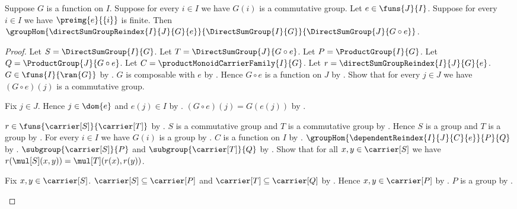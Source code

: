 \begin{theorem}\label{direct_sum_group_reindex_hom}
    Suppose $G$ is a function on $I$.
    Suppose for every $i\in I$ we have $G(i)$ is a commutative group.
    Let $e\in\funs{J}{I}$.
    Suppose for every $i\in I$ we have $\preimg{e}{\{i\}}$ is finite.
    Then
        $\groupHom{\directSumGroupReindex{I}{J}{G}{e}}{
            \DirectSumGroup{I}{G}}{\DirectSumGroup{J}{G\circ e}}$.
\end{theorem}
\begin{proof}
    Let $S=\DirectSumGroup{I}{G}$.
    Let $T=\DirectSumGroup{J}{G\circ e}$.
    Let $P=\ProductGroup{I}{G}$.
    Let $Q=\ProductGroup{J}{G\circ e}$.
    Let $C=\productMonoidCarrierFamily{I}{G}$.
    Let $r=\directSumGroupReindex{I}{J}{G}{e}$.
    $G\in\funs{I}{\ran{G}}$ by
        .
    $G$ is composable with $e$ by .
    Hence $G\circ e$ is a function on $J$ by
        .
    Show that for every $j\in J$ we have
        $(G\circ e)(j)$ is a commutative group.
    \begin{subproof}
        Fix $j\in J$.
        Hence $j\in\dom{e}$ and $e(j)\in I$ by
            .
        $(G\circ e)(j)=G(e(j))$ by
            .
    \end{subproof}
    $r\in\funs{\carrier[S]}{\carrier[T]}$ by
        .
    $S$ is a commutative group and $T$ is a commutative group by
        .
    Hence $S$ is a group and $T$ is a group by
        .
    For every $i\in I$ we have $G(i)$ is a group by
        .
    $C$ is a function on $I$ by
        .
    $\groupHom{\dependentReindex{I}{J}{C}{e}}{P}{Q}$ by
        .
    $\subgroup{\carrier[S]}{P}$ and
        $\subgroup{\carrier[T]}{Q}$ by
        .
    Show that for all $x,y\in\carrier[S]$ we have
        $r(\mul[S](x,y))=\mul[T](r(x),r(y))$.
    \begin{subproof}
        Fix $x,y\in\carrier[S]$.
        $\carrier[S]\subseteq\carrier[P]$ and
            $\carrier[T]\subseteq\carrier[Q]$ by
            .
        Hence $x,y\in\carrier[P]$ by .
        $P$ is a group by .

\end{subproof}
\end{proof}
